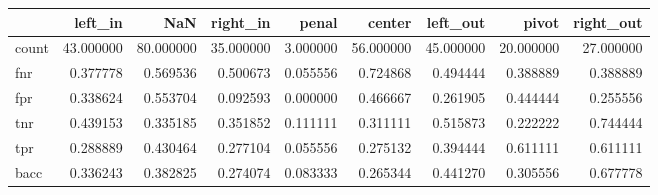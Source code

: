 \begin{tabular}{lrrrrrrrr}
\toprule
{} &    left\_in &        NaN &   right\_in &     penal &     center &   left\_out &      pivot &  right\_out \\
\midrule
count &  43.000000 &  80.000000 &  35.000000 &  3.000000 &  56.000000 &  45.000000 &  20.000000 &  27.000000 \\
fnr   &   0.377778 &   0.569536 &   0.500673 &  0.055556 &   0.724868 &   0.494444 &   0.388889 &   0.388889 \\
fpr   &   0.338624 &   0.553704 &   0.092593 &  0.000000 &   0.466667 &   0.261905 &   0.444444 &   0.255556 \\
tnr   &   0.439153 &   0.335185 &   0.351852 &  0.111111 &   0.311111 &   0.515873 &   0.222222 &   0.744444 \\
tpr   &   0.288889 &   0.430464 &   0.277104 &  0.055556 &   0.275132 &   0.394444 &   0.611111 &   0.611111 \\
bacc  &   0.336243 &   0.382825 &   0.274074 &  0.083333 &   0.265344 &   0.441270 &   0.305556 &   0.677778 \\
\bottomrule
\end{tabular}
